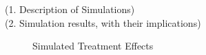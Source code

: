 (1. Description of Simulations) \\ 

(2. Simulation results, with their implications) \\ 
\begin{figure}
    \caption{Simulated Treatment Effects}
\end{figure}
